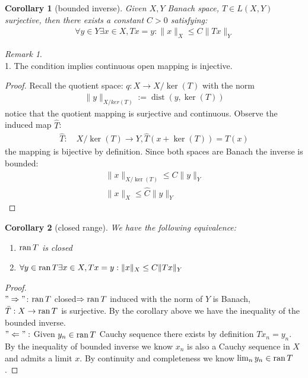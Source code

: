 \documentclass[a4paper,11pt,fleqn]{book}
\newtheorem{corollary}{Corollary}[theorem]
\theoremstyle{definition}
\theoremstyle{remark}
\newtheorem*{remark}{Remark}
\DeclareMathOperator*{\dist}{dist}
\begin{document}
\begin{corollary}[bounded inverse]
	Given $X, Y$ Banach space, $T \in L(X, Y)$ surjective, then there exists a constant $C > 0$ satisfying:
	\begin{align*}
		\forall y \in Y \exists x \in X, Tx = y: \|x\|_X \le C \|Tx\|_Y
	\end{align*}
\end{corollary}
\begin{remark}\quad\\
1. The condition implies continuous open mapping is injective.  
\end{remark}
\begin{proof}
Recall the quotient space: $q : X \rightarrow X \slash \ker(T)$ with the norm
\begin{align*}
	\|y\|_{X\slash ker(T)} := \dist(y, \ker(T))
\end{align*}
notice that the quotient mapping is surjective and continuous. Observe the induced map $\hat{T}$:
\begin{align*}
	\hat{T}:\quad X\slash \ker(T) \rightarrow Y, \hat{T}(x + \ker(T)) = T(x)
\end{align*}
the mapping is bijective by definition. Since both spaces are Banach the inverse is bounded:
\begin{align*}
	\|x\|_{X\slash\ker(T)} \le C \|y\|_Y\\
	\|x\|_X \le \hat{C} \|y\|_Y
\end{align*}
\end{proof}

\begin{corollary}[closed range]
		We have the following equivalence:
	\begin{enumerate}
		\item $\operatorname{ran} T$ is closed
		\item $\forall y \in \operatorname{ran} T \exists x \in X, Tx = y: \|x\|_X \le C \|Tx\|_Y$
	\end{enumerate}
\end{corollary}
\begin{proof}
	\quad\\
	$"\Rightarrow" $: $\operatorname{ran} T$ closed$\Rightarrow \operatorname{ran} T$ induced with the norm of $Y$ is Banach, $\bar{T}: X \rightarrow \operatorname{ran} T$ is surjective. By the corollary above we have the inequality of the bounded inverse. \\
	$"\Leftarrow":$ Given $y_n \in \operatorname{ran} T$ Cauchy sequence there exists by definition $Tx_n = y_n$. By the inequality of bounded inverse we know $x_n$ is also a Cauchy sequence in $X$ and admits a limit $x$. By continuity and completeness we know $\lim_n y_n \in \operatorname{ran} T$. 
\end{proof}
\end{document}
